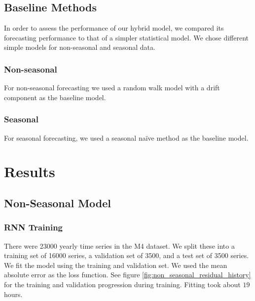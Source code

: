 \documentclass[a4paper,12pt]{article}
\theoremstyle{definition}
\begin{document}
\subsection{Baseline Methods}
In order to assess the performance of our hybrid model, we compared its forecasting performance to that of a simpler statistical model. We chose different simple models for non-seasonal and seasonal data.

\subsubsection{Non-seasonal}\label{sec:baseline_methods_non_seasonal}
For non-seasonal forecasting we used a random walk model with a drift component as the baseline model.

\subsubsection{Seasonal}\label{sec:baseline_methods_seasonal}
For seasonal forecasting, we used a seasonal na{\"i}ve method as the baseline model.



\section{Results}
\subsection{Non-Seasonal Model}
\subsubsection{RNN Training}\label{sec:non_seasonal_rnn_training}
There were  \num[group-separator={,}]{23000} yearly time series in the M4 dataset. We split these into a training set of  \num[group-separator={,}]{16000} series, a validation set of  \num[group-separator={,}]{3500}, and a test set of  \num[group-separator={,}]{3500} series. We fit the model using the training and validation set. We used the mean absolute error as the loss function. See figure \ref{fig:non_seasonal_residual_history} for the training and validation progression during training. Fitting took about $19$ hours. 
\end{document}
